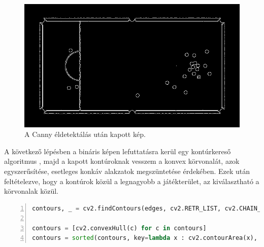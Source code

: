 \begin{figure}[!ht]
    \centering
    \includegraphics[width=140mm, keepaspectratio]{figures/input_screen_edge.png}
    \caption{A Canny éldetektálás után kapott kép.}
    \label{fig:bemeneti_kep_edge}
\end{figure}

\par A következő lépésben a bináris képen lefuttatásra kerül egy kontúrkereső algoritmus \cite{SUZUKI198532}, majd a kapott kontúroknak vesszem a konvex körvonalát, azok egyszerűsítése, esetleges konkáv alakzatok megszüntetése érdekében. Ezek után feltételezve, hogy a kontúrok közül a legnagyobb a játékterület, az kiválasztható a körvonalak közül.

\vspace{2mm}
\hspace{-10mm}
\begin{minipage}{\linewidth}
\begin{lstlisting}[language=Python, numbers=left, caption={Kontúrok keresése.}, label={cod:contours}]
contours, _ = cv2.findContours(edges, cv2.RETR_LIST, cv2.CHAIN_APPROX_SIMPLE)

contours = [cv2.convexHull(c) for c in contours]
contours = sorted(contours, key=lambda x : cv2.contourArea(x), reverse=True)[:1]
\end{lstlisting}
\end{minipage}

